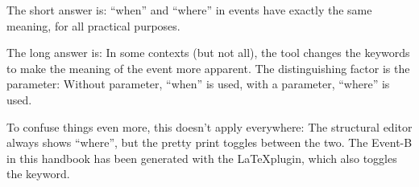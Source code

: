 The short answer is: ``when'' and ``where'' in events have exactly the same meaning, for all practical purposes.

The long answer is: In some contexts (but not all), the tool changes the keywords to make the meaning of the event more apparent.  The distinguishing factor is the parameter: Without parameter, ``when'' is used, with a parameter, ``where'' is used.

To confuse things even more, this doesn't apply everywhere: The structural editor always shows ``where'', but the pretty print toggles between the two.  The Event-B in this handbook has been generated with the \LaTeX plugin, which also toggles the keyword.

